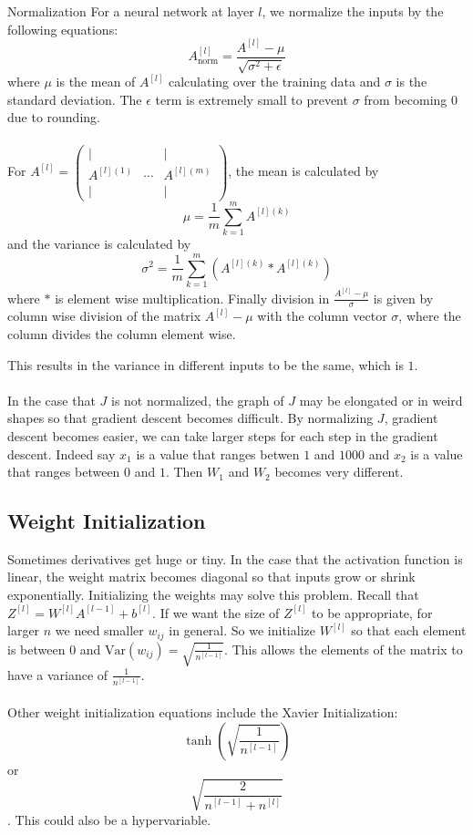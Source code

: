\documentclass[a4paper]{article}
\begin{document}
\begin{defn}{Normalization}{} For a neural network at layer $l$, we normalize the inputs by the following equations: $$A_{\text{norm}}^{[l]}=\frac{A^{[l]}-\mu}{\sqrt{\sigma^2+\epsilon}}$$ where $\mu$ is the mean of $A^{[l]}$ calculating over the training data and $\sigma$ is the standard deviation. The $\epsilon$ term is extremely small to prevent $\sigma$ from becoming $0$ due to rounding. \\~\\
For $A^{[l]}=\begin{pmatrix}
| & & |\\
A^{[l](1)} & \cdots & A^{[l](m)}\\
| & & |
\end{pmatrix}$, the mean is calculated by $$\mu=\frac{1}{m}\sum_{k=1}^mA^{[l](k)}$$ and the variance is calculated by $$\sigma^2=\frac{1}{m}\sum_{k=1}^m(A^{[l](k)}\ast A^{[l](k)})$$ where $\ast$ is element wise multiplication. Finally division in $\frac{A^{[l]}-\mu}{\sigma}$ is given by column wise division of the matrix $A^{[l]}-\mu$ with the column vector $\sigma$, where the column divides the column element wise. 
\end{defn}

This results in the variance in different inputs to be the same, which is $1$. \\~\\
In the case that $J$ is not normalized, the graph of $J$ may be elongated or in weird shapes so that gradient descent becomes difficult. By normalizing $J$, gradient descent becomes easier, we can take larger steps for each step in the gradient descent. Indeed say $x_1$ is a value that ranges betwen $1$ and $1000$ and $x_2$ is a value that ranges between $0$ and $1$. Then $W_1$ and $W_2$ becomes very different. 

\subsection{Weight Initialization}
Sometimes derivatives get huge or tiny. In the case that the activation function is linear, the weight matrix becomes diagonal so that inputs grow or shrink exponentially. Initializing the weights may solve this problem. Recall that $Z^{[l]}=W^{[l]}A^{[l-1]}+b^{[l]}$. If we want the size of $Z^{[l]}$ to be appropriate, for larger $n$ we need smaller $w_{ij}$ in general. So we initialize $W^{[l]}$ so that each element is between $0$ and $\text{Var}(w_{ij})=\sqrt{\frac{1}{n^{[l-1]}}}$. This allows the elements of the matrix to have a variance of $\frac{1}{n^{[l-1]}}$. \\~\\
Other weight initialization equations include the Xavier Initialization: $$\tanh(\sqrt{\frac{1}{n^{[l-1]}}})$$ or $$\sqrt{\frac{2}{n^{[l-1]}+n^{[l]}}}$$. This could also be a hypervariable. 
\end{document}
